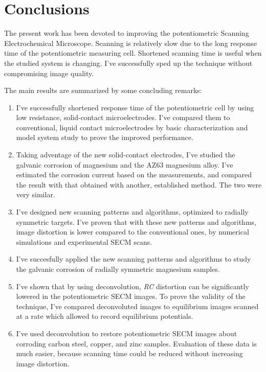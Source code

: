 \chapter{Conclusions}
\pagestyle{plain}
The present work has been devoted to improving the potentiometric Scanning Electrochemical Microscope.
Scanning is relatively slow due to the long response time of the potentiometric measuring cell.
Shortened scanning time is useful when the studied system is changing.
I've successfully sped up the technique without compromising image quality.

The main results are summarized by some concluding remarks:

\begin{enumerate}
\item I've successfully shortened response time of the potentiometric cell by using low resistance, solid-contact microelectrodes.
I've compared them to conventional, liquid contact microelectrodes by basic characterization and model system study to prove the improved performance.

\item Taking adventage of the new solid-contact electrodes, I've studied the galvanic corrosion of magnesium and the AZ63 magnesium alloy.
I've estimated the corrosion current based on the measurements, and compared the result with that obtained with another, established method.
The two were very similar.

\item I've designed new scanning patterns and algorithms, optimized to radially symmetric targets.
I've proven that with these new patterns and algorithms, image distortion is lower compared to the conventional ones, by numerical simulations and experimental SECM scans.

\item I've succesfully applied the new scanning patterns and algorithms to study the galvanic corrosion of radially symmetric magnesium samples.

\item I've shown that by using deconvolution, \emph{RC} distortion can be significantly lowered in the potentiometric SECM images.
To prove the validity of the technique, I've compared deconvoluted images to equilibrium images scanned at a rate which allowed to record equilibrium potentials.

\item I've used deconvolution to restore potentiometric SECM images about corroding carbon steel, copper, and zinc samples.
Evaluation of these data is much easier, because scanning time could be reduced without increasing image distortion.

\end{enumerate}
